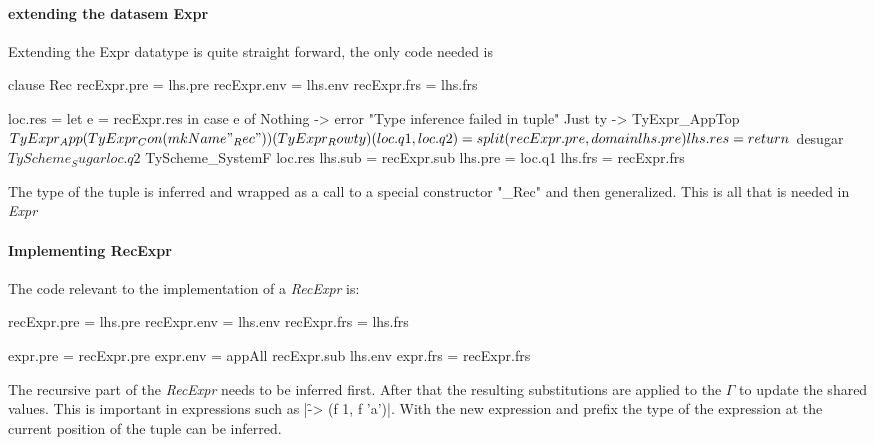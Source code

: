 \paragraph{extending the datasem Expr}
Extending the Expr datatype is quite straight forward, the only code needed is

\begin{code}
clause Rec
   recExpr.pre  = lhs.pre
   recExpr.env  = lhs.env
   recExpr.frs  = lhs.frs
   
   loc.res =  let e = recExpr.res
              in case e of
                   Nothing  ->  error "Type inference failed in tuple"
                   Just ty  ->  TyExpr_AppTop $
                                   TyExpr_App
                                      (TyExpr_Con (mkName "_Rec"))
                                      (TyExpr_Row ty)
   
   (loc.q1, loc.q2) = split (recExpr.pre, domain lhs.pre)
   lhs.res = return  $ desugar 
                     $ TyScheme_Sugar loc.q2 
                     $ TyScheme_SystemF loc.res
   lhs.sub  = recExpr.sub
   lhs.pre  = loc.q1
   lhs.frs  = recExpr.frs
\end{code}
The type of the tuple is inferred and wrapped as a call to a special constructor "\_Rec" and then generalized. This is all that is needed in \emph{Expr}

\paragraph{Implementing RecExpr}
The code relevant to the implementation of a \emph{RecExpr} is:

\begin{code}
   recExpr.pre  = lhs.pre
   recExpr.env  = lhs.env
   recExpr.frs  = lhs.frs
   
   expr.pre  = recExpr.pre
   expr.env  = appAll recExpr.sub lhs.env
   expr.frs  = recExpr.frs
\end{code}
The recursive part of the \emph{RecExpr} needs to be inferred first. After that the resulting substitutions are applied to the $\Gamma$ to update the shared values. This is important in expressions such as |\f -> (f 1, f 'a')|. With the new expression and prefix the type of the expression at the current position of the tuple can be inferred.

